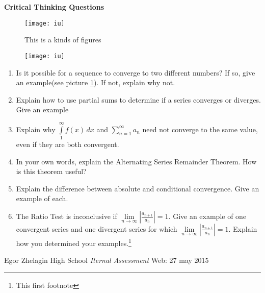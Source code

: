 \documentclass[11pt,  a4paper]{article}
\begin{document}
\pagebreak

\textbf{Critical Thinking Questions}

\begin{figure}[h]
\centering
\texttt{[image: iu]}\\
\caption{This is a kinds of figures}
\label{fig:kinds}
\end{figure}

\begin{figure}[b] %
\texttt{[image: iu]}
\end{figure}


\begin{enumerate}
\item Is it possible for a sequence to converge to two different numbers? If so, give an example(see picture \ref{fig:kinds}). If not, explain why not.
\item Explain how to use partial sums to determine if a series converges or diverges. Give an example
\item Explain why $\int\limits_{1}^{\infty} f(x)\,dx$ and $\sum\limits_{n=1}^{\infty} a_n$ need not converge to the same value, even if they are both convergent.
\item  In your own words, explain the Alternating Series Remainder Theorem. How is this theorem useful?
\item Explain the difference between absolute and conditional convergence. Give an example of each.
\item The Ratio Test is inconclusive if $\displaystyle{\lim\limits_{n \to \infty} \left| \frac{a_{n+1}}{a_n} \right| =1}$. Give an example of one convergent series and one divergent series for which $\displaystyle{\lim\limits_{n \to \infty} \left| \frac{a_{n+1}}{a_n} \right| =1}$. Explain how you determined your examples.\footnote{This first footnote}
\end{enumerate}


\pagebreak
\begin{thebibliography}{2}

Egor Zhelagin
	High School
\textit{Iternal Assessment}
Web: 27 may 2015

\end{thebibliography}
\end{document}
